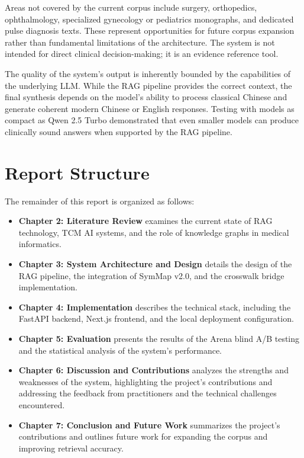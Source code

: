 \documentclass[11pt,a4paper]{report}
\begin{document}
Areas not covered by the current corpus include surgery, orthopedics, ophthalmology, specialized gynecology or pediatrics monographs, and dedicated pulse diagnosis texts. These represent opportunities for future corpus expansion rather than fundamental limitations of the architecture. The system is not intended for direct clinical decision-making; it is an evidence reference tool.

The quality of the system's output is inherently bounded by the capabilities of the underlying LLM. While the RAG pipeline provides the correct context, the final synthesis depends on the model's ability to process classical Chinese and generate coherent modern Chinese or English responses. Testing with models as compact as Qwen 2.5 Turbo demonstrated that even smaller models can produce clinically sound answers when supported by the RAG pipeline.

\section{Report Structure}
The remainder of this report is organized as follows:
\begin{itemize}
    \item \textbf{Chapter 2: Literature Review} examines the current state of RAG technology, TCM AI systems, and the role of knowledge graphs in medical informatics.
    \item \textbf{Chapter 3: System Architecture and Design} details the design of the RAG pipeline, the integration of SymMap v2.0, and the crosswalk bridge implementation.
    \item \textbf{Chapter 4: Implementation} describes the technical stack, including the FastAPI backend, Next.js frontend, and the local deployment configuration.
    \item \textbf{Chapter 5: Evaluation} presents the results of the Arena blind A/B testing and the statistical analysis of the system's performance.
    \item \textbf{Chapter 6: Discussion and Contributions} analyzes the strengths and weaknesses of the system, highlighting the project's contributions and addressing the feedback from practitioners and the technical challenges encountered.
    \item \textbf{Chapter 7: Conclusion and Future Work} summarizes the project's contributions and outlines future work for expanding the corpus and improving retrieval accuracy.
\end{itemize}
\end{document}
